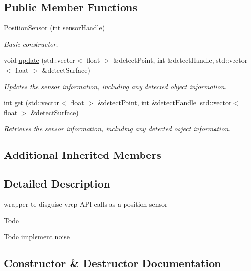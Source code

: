 \subsection*{Public Member Functions}
\begin{DoxyCompactItemize}
\item 
\hyperlink{classPositionSensor_a1bc5cb93c92c04eef26d406dbb304ead}{Position\+Sensor} (int sensor\+Handle)
\begin{DoxyCompactList}\small\item\em Basic constructor. \end{DoxyCompactList}\item 
void \hyperlink{classPositionSensor_a9559a5ec535e9daacb7b9dbf5b66027a}{update} (std\+::vector$<$ float $>$ \&detect\+Point, int \&detect\+Handle, std\+::vector$<$ float $>$ \&detect\+Surface)
\begin{DoxyCompactList}\small\item\em Updates the sensor information, including any detected object information. \end{DoxyCompactList}\item 
int \hyperlink{classPositionSensor_a0b8c45d846d3442d94e2ef767fddf31d}{get} (std\+::vector$<$ float $>$ \&detect\+Point, int \&detect\+Handle, std\+::vector$<$ float $>$ \&detect\+Surface)
\begin{DoxyCompactList}\small\item\em Retrieves the sensor information, including any detected object information. \end{DoxyCompactList}\end{DoxyCompactItemize}
\subsection*{Additional Inherited Members}


\subsection{Detailed Description}
wrapper to disguise vrep A\+PI calls as a position sensor 

\begin{DoxyRefDesc}{Todo}
\item[\hyperlink{todo__todo000007}{Todo}]implement noise \end{DoxyRefDesc}


\subsection{Constructor \& Destructor Documentation}
